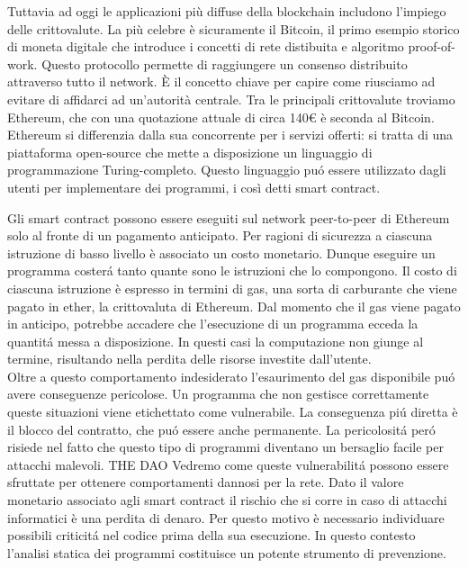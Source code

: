 


Tuttavia ad oggi le applicazioni più diffuse della blockchain includono l'impiego delle crittovalute.
La più celebre è sicuramente il Bitcoin, il primo esempio storico di moneta digitale che introduce i concetti di rete distibuita e algoritmo proof-of-work. Questo protocollo permette di raggiungere un consenso distribuito attraverso tutto il network. \`E il concetto chiave per capire come riusciamo ad evitare di affidarci ad un'autorità centrale.\newline
\indent Tra le principali crittovalute troviamo Ethereum, che con una quotazione attuale di circa 140\euro{} è seconda al Bitcoin. Ethereum si differenzia dalla sua concorrente per i servizi offerti: si tratta di una piattaforma open-source che mette a disposizione un linguaggio di programmazione Turing-completo. Questo linguaggio puó essere utilizzato dagli utenti per implementare dei programmi, i così detti smart contract.\newline


Gli smart contract possono essere eseguiti sul network peer-to-peer di Ethereum solo al fronte di un pagamento anticipato. Per ragioni di sicurezza a ciascuna istruzione di basso livello è associato un costo monetario. Dunque eseguire un programma costerá tanto quante sono le istruzioni che lo compongono.
Il costo di ciascuna istruzione è espresso in termini di gas, una sorta di carburante che viene pagato in ether, la crittovaluta di Ethereum.\newline
\indent Dal momento che il gas viene pagato in anticipo, potrebbe accadere che l'esecuzione di un programma ecceda la quantitá messa a disposizione. In questi casi la computazione non giunge al termine, risultando nella perdita delle risorse investite dall'utente.\\ 
\indent Oltre a questo comportamento indesiderato l'esaurimento del gas disponibile puó avere conseguenze pericolose. Un programma che non gestisce correttamente queste situazioni viene etichettato come vulnerabile. La conseguenza piú diretta è il blocco del contratto, che puó essere anche permanente. La pericolositá peró risiede nel fatto che questo tipo di programmi diventano un bersaglio facile per attacchi malevoli. THE DAO Vedremo come queste vulnerabilitá possono essere sfruttate per ottenere comportamenti dannosi per la rete.\newline
\indent Dato il valore monetario associato agli smart contract il rischio che si corre in caso di attacchi informatici è una perdita di denaro. Per questo motivo è necessario individuare possibili criticitá nel codice prima della sua esecuzione. In questo contesto l'analisi statica dei programmi costituisce un potente
strumento di prevenzione.\newline

